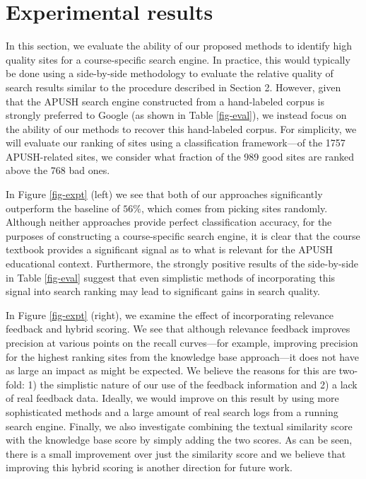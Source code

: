 \documentclass[pdfpagelabels=false,plainpages=true]{acm_proc_article-sp}
\begin{document}
\section{Experimental results}

In this section, we evaluate the ability of our proposed methods to identify
high quality sites for a course-specific search engine. In practice, this
would typically be done using a side-by-side methodology to evaluate the
relative quality of search results similar to the procedure described in Section
2. However, given that the APUSH search engine constructed from a hand-labeled
corpus is strongly preferred to Google (as shown in Table \ref{fig-eval}), we
instead focus on the ability of our methods to recover this hand-labeled
corpus. For simplicity, we will evaluate our ranking of sites using a 
classification framework---of the 1757 APUSH-related sites, we consider what
fraction of the 989 good sites are ranked above the 768 bad ones.

In Figure \ref{fig-expt} (left) we see that both of our approaches significantly
outperform the baseline of $56\%$, which comes from picking sites
randomly. Although neither approaches provide perfect classification accuracy,
for the purposes of constructing a course-specific search engine, it is clear
that the course textbook provides a significant signal as to what is relevant
for the APUSH educational context.  Furthermore, the strongly positive
results of the side-by-side in Table \ref{fig-eval} suggest that even simplistic
methods of incorporating this signal into search ranking may lead to significant
gains in search quality.


In Figure \ref{fig-expt} (right), we examine the effect of incorporating
relevance feedback and hybrid scoring. We see that although relevance feedback
improves precision at various points on the recall curves---for example,
improving precision for the highest ranking sites from the knowledge base
approach---it does not have as large an impact as might be expected. We believe
the reasons for this are two-fold: 1) the simplistic nature of our use of the
feedback information and 2) a lack of real feedback data. Ideally, we would
improve on this result by using more sophisticated methods and a large amount of
real search logs from a running search engine. Finally, we also
investigate combining the textual similarity score with the knowledge base
score by simply adding the two scores. As can be seen, there
is a small improvement over just the similarity score and we believe that
improving this hybrid scoring is another direction for future work.
\end{document}
